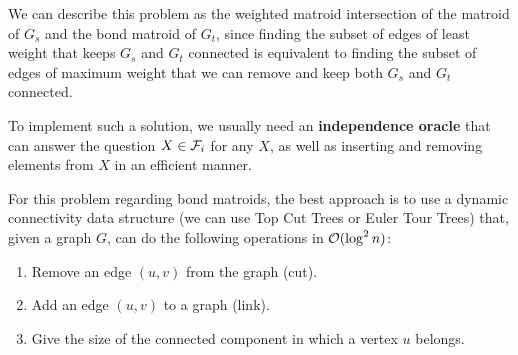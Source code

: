 \documentclass[english,12pt]{article}
\begin{document}
        We can describe this problem as the weighted matroid intersection of the matroid of $G_s$ and the bond matroid of $G_t$, since finding the subset of edges of least weight that keeps $G_s$ and $G_t$ connected is equivalent to finding the subset of edges of maximum weight that we can remove and keep both $G_s$ and $G_t$ connected.

        To implement such a solution, we usually need an \textbf{independence oracle} that can answer the question $X \in \mathcal{F}_i$ for any $X$, as well as inserting and removing elements from $X$ in an efficient manner.

        For this problem regarding bond matroids, the best approach is to use a dynamic connectivity data structure (we can use Top Cut Trees or Euler Tour Trees) that, given a graph $G$, can do the following operations in $\mathcal{O}(\log^2 n)$:
        \begin{enumerate}
            \item Remove an edge $(u, v)$ from the graph (cut).
            \item Add an edge $(u, v)$ to a graph (link).
            \item Give the size of the connected component in which a vertex $u$ belongs.
        \end{enumerate}
\end{document}
